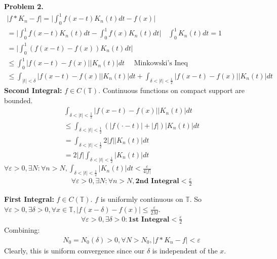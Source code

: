 \documentclass{article}
\newcommand{\T}{\mathbb{T}}
\begin{document}
\textbf{Problem 2. } 
\begin{gather*}
    |f * K_n - f| = \lvert \int_0^1 f(x-t) K_n(t) dt - f(x) \rvert\\
    = \lvert \int_0^1 f(x-t) K_n(t) dt - \int_0^1 f(x)K_n(t)dt \rvert \quad \int_0^1 K_n(t) dt = 1 \\
    = \lvert \int_0^1 \left(f(x-t) -f(x) \right) K_n(t) dt \rvert\\
    \leq \int_0^1 \lvert f(x-t) -f(x) \rvert \lvert K_n(t) \rvert dt \quad \text{ Minkowski's Ineq }\\
    \leq \int_{|t| <\delta} \lvert f(x-t) -f(x) \rvert \lvert K_n(t) \rvert dt + \int_{\delta<|t|<\frac{1}{2}} \lvert f(x-t) -f(x) \rvert \lvert K_n(t) \rvert dt
\end{gather*}
\textbf{Second Integral: } $f \in C(\T)$. Continuous functions on compact support are bounded.
\begin{gather*}
    \int_{\delta<|t|<\frac{1}{2}} \lvert f(x-t) -f(x) \rvert \lvert K_n(t) \rvert dt\\
    \leq \int_{\delta<|t|<\frac{1}{2}} (\lvert f(\cdot-t) \rvert + \lvert f \rvert) \lvert K_n(t) \rvert dt\\
    = \int_{\delta<|t|<\frac{1}{2}} 2\lvert f \rvert \lvert K_n(t) \rvert dt\\
    = 2\lvert f \rvert \int_{\delta<|t|<\frac{1}{2}} \lvert K_n(t) \rvert dt
\end{gather*}
$\forall \varepsilon>0, \exists N: \forall n>N, \int_{\delta<|t|<\frac{1}{2}} \lvert K_n(t) \rvert dt < \frac{\varepsilon}{4|f|}$
\begin{gather*}
    \forall \varepsilon>0, \exists N: \forall n>N, \textbf{2nd Integral} < \frac{\varepsilon}{2}
\end{gather*}

\textbf{First Integral: } $f \in C(\T)$. $f$ is uniformly continuous on $\T$. So $\forall \varepsilon>0, \exists \delta >0, \forall x \in\T, |f(x-\delta) - f(x)| \leq \frac{\varepsilon}{2M}$.
\begin{gather*}
    \forall \varepsilon>0, \exists \delta >0: \textbf{1st Integral} < \frac{\varepsilon}{2}
\end{gather*}
Combining:
\begin{gather*}
    N_0 = N_0(\delta) > 0, \forall N > N_0, |f*K_n - f| < \varepsilon
\end{gather*}
Clearly, this is uniform convergence since our $\delta$ is independent of the $x$.
\\~
\end{document}
